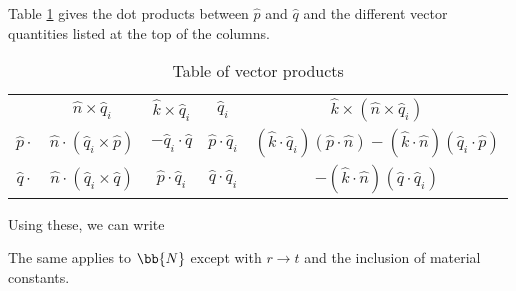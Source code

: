 Table \ref{tableofdotproducts} gives the dot products between $\hat{p}$ and $\hat{q}$ and the different vector quantities listed at the top of the columns.
\begin{table}[htp]
\caption{Table of vector products}
\vspace{-3mm}
\begin{center}
\begin{tabular}{|c||c|c|c|c|}
\hline
& $\hat{n}\times\hat{q}_i$ & $\hat{k}\times\hat{q}_i$ & $\hat{q}_i$ & $\hat{k}\times(\hat{n}\times\hat{q}_i)$ \\ \hhline{|=|=|=|=|=|}
$\hat{p} \cdot$ & $\hat{n}\cdot (\hat{q}_i\times\hat{p}) $ & $-\hat{q}_i\cdot \hat{q}$  & $\hat{p}\cdot \hat{q}_i$ & $(\hat{k} \cdot \hat{q}_i) (\hat{p} \cdot \hat{n}) - (\hat{k} \cdot \hat{n}) (\hat{q}_i \cdot \hat{p}) $ \\ \hline
$\hat{q} \cdot$ & $\hat{n}\cdot (\hat{q}_i\times\hat{q}) $ & $\hat{p}\cdot \hat{q}_i$ &$ \hat{q} \cdot  \hat{q}_i$ & $ -(\hat{k} \cdot \hat{n}) (\hat{q} \cdot \hat{q}_i) $ \\ \hline
\end{tabular}
\end{center}
\label{tableofdotproducts}
\end{table}%

Using these, we can write

The same applies to $\bb{N}$ except with $r \rightarrow t$ and the inclusion of material constants. 


